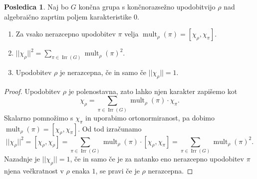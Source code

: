 \documentclass[11pt]{book}
\DeclareMathOperator\mult{mult}
\DeclareMathOperator\Irr{Irr}
\theoremstyle{definition}
\theoremstyle{zgled}
\theoremstyle{odprtproblem}
\theoremstyle{domacanaloga}
\newenvironment{dokaz}
    {\color{siva}\begin{proof}}
    {\end{proof}}
\theoremstyle{izrek}
\newtheorem*{posledica}{Posledica}
\begin{document}
\begin{posledica}
Naj bo $G$ končna grupa s končnorazsežno upodobitvijo $\rho$ nad algebraično zaprtim poljem karakteristike $0$. 
\begin{enumerate}
    \item Za vsako nerazcepno upodobitev $\pi$ velja $\mult_{\rho}(\pi) = [ \chi_{\rho}, \chi_{\pi} ]$.
    \item $|| \chi_{\rho} ||^2 = \sum_{\pi \in \Irr(G)} \mult_{\rho}(\pi)^2$.
    \item Upodobitev $\rho$ je nerazcepna, če in samo če $|| \chi_{\rho} || = 1$.
\end{enumerate}
\end{posledica}
\begin{dokaz}
Upodobitev $\rho$ je polenostavna, zato lahko njen karakter zapišemo kot
\[
    \chi_{\rho} = \sum_{\pi \in \Irr(G)} \mult_{\rho}(\pi) \cdot \chi_{\pi}.
\]
Skalarno pomnožimo s $\chi_{\pi}$ in uporabimo ortonormiranost, pa dobimo $\mult_{\rho}(\pi) = [ \chi_{\rho}, \chi_{\pi} ]$. Od tod izračunamo
\[
    ||\chi_{\rho}||^2 = [ \chi_{\rho}, \chi_{\rho} ] 
    = \sum_{\pi \in \Irr(G)} \mult_{\rho}(\pi) \cdot [ \chi_{\rho}, \chi_{\pi} ] 
    = \sum_{\pi \in \Irr(G)} \mult_{\rho}(\pi)^2.
\]
Nazadnje je $||\chi_{\rho}|| = 1$, če in samo če je za natanko eno nerazcepno upodobitev $\pi$ njena večkratnost v $\rho$ enaka $1$, se pravi če je $\rho$ nerazcepna.
\end{dokaz}
\end{document}
